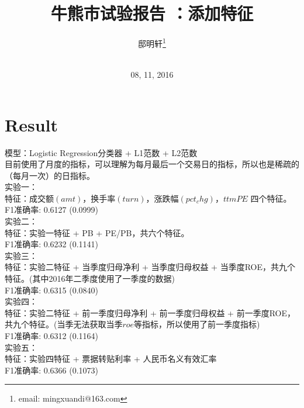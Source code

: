 \documentclass[10pt,a4paper]{article}
\author{邸明轩\footnote{email: mingxuandi@163.com}\\[2ex]
	\\[2ex]}
\title{牛熊市试验报告 \uppercase\expandafter{\romannumeral2}：添加特征}
\date{08, 11, 2016}
\begin{document}
	
	\makeatletter
	\let\@afterindentfalse\@afterindenttrue
	\@afterindenttrue
	\makeatother
	\setlength{\parindent}{2em}  %
	
	\maketitle
	
	\section{Result }
\noindent 模型：Logistic Regression分类器 + L1范数 + L2范数\\
目前使用了月度的指标，可以理解为每月最后一个交易日的指标，所以也是稀疏的（每月一次）的日指标。\\

\noindent 实验一：\\
		特征：成交额$(amt)$，换手率$(turn)$，涨跌幅$(pct_chg)$，$ttm PE$ 四个特征。\\
					F1准确率: 0.6127 (0.0999)\\

\noindent 实验二：\\
		特征：实验一特征 + PB + PE/PB，共六个特征。\\
		F1准确率: 0.6232 (0.1141)\\
		
		
\noindent  实验三：\\
		特征：实验二特征 + 当季度归母净利 + 当季度归母权益 + 当季度ROE，共九个特征。(其中2016年二季度使用了一季度的数据)\\
		F1准确率: 0.6315 (0.0840)\\
		
\noindent  实验四：\\
特征：实验二特征 + 前一季度归母净利 + 前一季度归母权益 + 前一季度ROE，共九个特征。(当季无法获取当季$roe$等指标，所以使用了前一季度指标)\\
F1准确率: 0.6312 (0.1164)\\

\noindent  实验五：\\
特征：实验四特征 + 票据转贴利率 + 人民币名义有效汇率\\
F1准确率: 0.6366 (0.1073)\\

%	
	
\end{document}
